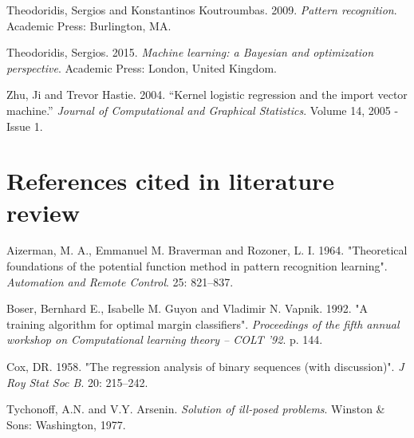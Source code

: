 \documentclass[letterpaper, 11pt]{article}
\begin{document}
Theodoridis, Sergios and Konstantinos Koutroumbas. 2009. \emph{Pattern recognition}. Academic Press: Burlington, MA.

Theodoridis, Sergios. 2015. \emph{Machine learning: a Bayesian and optimization perspective}. Academic Press: London, United Kingdom.

Zhu, Ji and Trevor Hastie. 2004. ``Kernel logistic regression and the import vector machine.'' \emph{Journal of Computational and Graphical Statistics}.  
Volume 14, 2005 - Issue 1.

\section{References cited in literature review}

Aizerman, M. A., Emmanuel M. Braverman and Rozoner, L. I. 1964. "Theoretical foundations of the potential function method in pattern recognition learning". \emph{Automation and Remote Control}. 25: 821–837.

Boser, Bernhard E., Isabelle M. Guyon and Vladimir N. Vapnik. 1992. "A training algorithm for optimal margin classifiers". \emph{Proceedings of the fifth annual workshop on Computational learning theory – COLT '92}. p. 144.

Cox, DR. 1958. "The regression analysis of binary sequences (with discussion)". \emph{J Roy Stat Soc B}. 20: 215–242.

Tychonoff, A.N. and V.Y. Arsenin. \emph{Solution of ill-posed problems}. Winston \& Sons: Washington, 1977.
\end{document}
